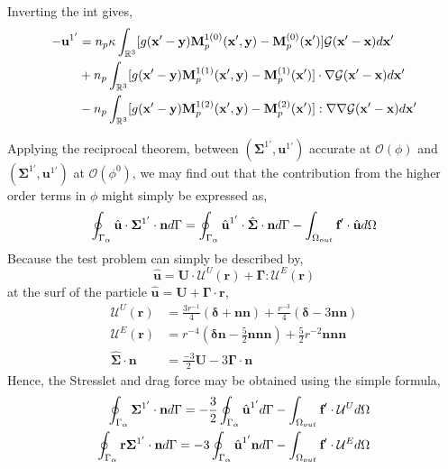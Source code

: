 \documentclass[12pt]{My_preprint}
\begin{document}
Inverting the int gives, 
\begin{align*}
    -\textbf{u}^{1'} &=
    n_p\kappa
    \int_{\mathbb{R}^3}
    [g(\textbf{x}'-\textbf{y})\textbf{M}_{p}^{1(0)}(\textbf{x}',\textbf{y})
     - \textbf{M}_{p}^{(0)}(\textbf{x}')]
      \mathcal{G}(\textbf{x}' - \textbf{x}) 
     d\textbf{x}'\\
    &+ 
    n_p\int_{\mathbb{R}^3}
    [g(\textbf{x}'-\textbf{y})\textbf{M}_{p}^{1(1)}(\textbf{x}',\textbf{y})
     - \textbf{M}_{p}^{(1)}(\textbf{x}')]
     \cdot \grad \mathcal{G}(\textbf{x}' - \textbf{x}) 
     d\textbf{x}'\\
    &-
    n_p\int_{\mathbb{R}^3}
    [g(\textbf{x}'-\textbf{y})\textbf{M}_{p}^{1(2)}(\textbf{x}',\textbf{y})
     - \textbf{M}_{p}^{(2)}(\textbf{x}')]
     : \grad\grad \mathcal{G}(\textbf{x}' - \textbf{x}) 
     d\textbf{x}'
\end{align*}

Applying the reciprocal theorem, between $(\bm\Sigma^{1'},\textbf{u}^{1'})$ accurate at $\mathcal{O}(\phi)$ and $(\bm\Sigma^{1'},\textbf{u}^{1'})$ at $\mathcal{O}(\phi^0)$, we may find out that the contribution from the higher order terms in $\phi$ might simply be expressed as, 
\begin{equation}
    \intS{\hat{\textbf{u}}\cdot \bm\Sigma^{1'}\cdot \textbf{n}}
    =
    \intS{\hat{\textbf{u}}^{1'}\cdot \hat{\bm\Sigma}\cdot \textbf{n}}
    - \intO[out]{\textbf{f}' \cdot \hat{\textbf{u}}} 
\end{equation}
Because the test problem can simply be described by, 
\begin{equation}
    \hat{\textbf{u}}
    =
    \textbf{U}\cdot \mathcal{U}^U(\textbf{r})
    +\bm\Gamma : \mathcal{U}^E(\textbf{r})
\end{equation}
at the surf of the particle $\hat{\textbf{u}} = \textbf{U} + \bm\Gamma \cdot \textbf{r}$,
\begin{align}
    \mathcal{U}^U(\textbf{r})
    &=
    \frac{3r^{-1}}{4}\left(
        \bm\delta
        + \textbf{nn}
    \right)
    +\frac{r^{-3}}{4}
    (\bm\delta - 3 \textbf{nn})\\
    \mathcal{U}^E(\textbf{r})
    &=
    r^{-4}(\bm\delta \textbf{n} - \frac{5}{2} \textbf{nnn})
    + \frac{5}{2} r^{-2} \textbf{nnn}\\
    \hat{\bm\Sigma}\cdot \textbf{n}
    &=
    \frac{-3}{2}\textbf{U}
    -3\bm\Gamma\cdot\textbf{n}
\end{align}
Hence, the Stresslet and drag force may be obtained using the simple formula, 
\begin{align}
    \intS{\bm\Sigma^{1'}\cdot \textbf{n}}
    =
    -\frac{3}{2}\intS{\hat{\textbf{u}}^{1'}}
    - \intO[out]{\textbf{f}' \cdot\mathcal{U}^U} \\
    \intS{\textbf{r} \bm\Sigma^{1'}\cdot \textbf{n}}
    =
    - 3\intS{\hat{\textbf{u}}^{1'}\textbf{n}}
    - \intO[out]{\textbf{f}' \cdot \mathcal{U}^E} \\
\end{align}
\end{document}
